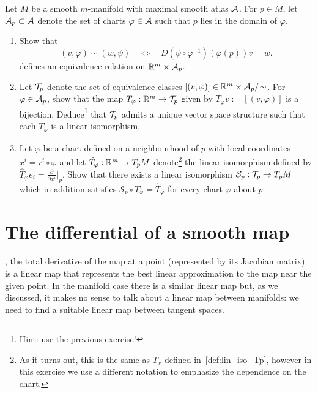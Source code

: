 \begin{exercise}
  Let $M$ be a smooth $m$-manifold with maximal smooth atlas $\mathcal{A}$.
  For $p\in M$, let $\mathcal{A}_p \subset \mathcal{A}$ denote the set of charts $\varphi\in\mathcal{A}$ such that $p$ lies in the domain of $\varphi$.
  \begin{enumerate}
    \item Show that
          \begin{equation}
            (v,\varphi) \sim (w, \psi)
            \quad\Longleftrightarrow\quad
            D(\psi \circ \varphi^{-1})(\varphi(p))v = w.
          \end{equation}
          defines an equivalence relation on $\mathbb{R}^m\times\mathcal{A}_p$.
    \item Let $\mathcal{T}_p$ denote the set of equivalence classes $[(v,\varphi)]\in \mathbb{R}^m\times\mathcal{A}_p/\!\sim$. For $\varphi\in\mathcal{A}_p$, show that the map $T_\varphi:\mathbb{R}^m\to\mathcal{T}_p$ given by $T_\varphi v := [(v,\varphi)]$ is a bijection.
          Deduce\footnote{Hint: use the previous exercise!} that $\mathcal{T}_p$ admits a unique vector space structure such that each $T_\varphi$ is a linear isomorphism.
    \item Let $\varphi$ be a chart defined on a neighbourhood of $p$ with local coordinates $x^i = r^i \circ \varphi$ and let $\hat T_\varphi :\mathbb{R}^m \to T_pM$ denote\footnote{As it turns out, this is the same as $T_x$ defined in~\eqref{def:lin_iso_Tp}, however in this exercise we use a different notation to emphasize the dependence on the chart.} the linear isomorphism defined by $\hat T_\varphi e_i = \frac{\partial}{\partial x^i}\big|_p$.
          Show that there exists a linear isomorphism $\mathcal{S}_p:\mathcal{T}_p\to T_pM$ which in addition satisfies $\mathcal{S}_p \circ T_\varphi = \hat T_\varphi$ for every chart $\varphi$ about $p$.
  \end{enumerate}
\end{exercise}

\section{The differential of a smooth map}\label{sec:diffsmooth}

, the total derivative of the map at a point (represented by its Jacobian matrix) is a linear map that represents the best linear approximation to the map near the given point.
In the manifold case there is a similar linear map but, as we discussed, it makes no sense to talk about a linear map between manifolds: we need to find a suitable linear map between tangent spaces.

